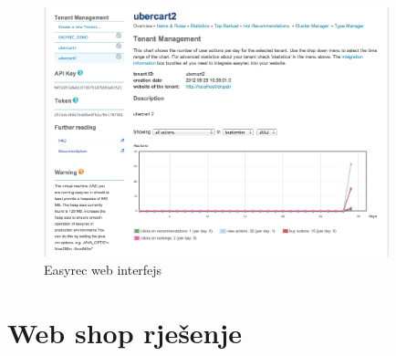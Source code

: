 \documentclass[times, utf8, seminar]{fit}
\begin{document}
\begin{figure}[H]
\centering
\includegraphics[width=10cm]{img/easyrec_1_tenant.png}
\caption{Easyrec web interfejs}
\end{figure}



\section{Web shop rješenje}
\end{document}
